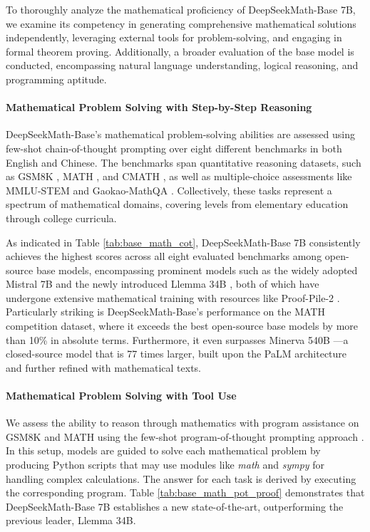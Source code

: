 To thoroughly analyze the mathematical proficiency of DeepSeekMath-Base 7B, we examine its competency in generating comprehensive mathematical solutions independently, leveraging external tools for problem-solving, and engaging in formal theorem proving. Additionally, a broader evaluation of the base model is conducted, encompassing natural language understanding, logical reasoning, and programming aptitude.

\paragraph{Mathematical Problem Solving with Step-by-Step Reasoning}

DeepSeekMath-Base’s mathematical problem-solving abilities are assessed using few-shot chain-of-thought prompting \citep{cot} over eight different benchmarks in both English and Chinese. The benchmarks span quantitative reasoning datasets, such as GSM8K \citep{gsm8k}, MATH \citep{MATH}, and CMATH \citep{wei2023cmath}, as well as multiple-choice assessments like MMLU-STEM \citep{mmlu} and Gaokao-MathQA \citep{agieval}. Collectively, these tasks represent a spectrum of mathematical domains, covering levels from elementary education through college curricula.

As indicated in Table \ref{tab:base_math_cot}, DeepSeekMath-Base 7B consistently achieves the highest scores across all eight evaluated benchmarks among open-source base models, encompassing prominent models such as the widely adopted Mistral 7B \citep{mistral} and the newly introduced Llemma 34B \citep{llemma}, both of which have undergone extensive mathematical training with resources like Proof-Pile-2 \citep{llemma}. Particularly striking is DeepSeekMath-Base’s performance on the MATH competition dataset, where it exceeds the best open-source base models by more than 10\% in absolute terms. Furthermore, it even surpasses Minerva 540B \citep{minerva}—a closed-source model that is 77 times larger, built upon the PaLM architecture \citep{palm} and further refined with mathematical texts.

\paragraph{Mathematical Problem Solving with Tool Use} We assess the ability to reason through mathematics with program assistance on GSM8K and MATH using the few-shot program-of-thought prompting approach \citep{pot,pal}. In this setup, models are guided to solve each mathematical problem by producing Python scripts that may use modules like \textit{math} and \textit{sympy} for handling complex calculations. The answer for each task is derived by executing the corresponding program. Table \ref{tab:base_math_pot_proof} demonstrates that DeepSeekMath-Base 7B establishes a new state-of-the-art, outperforming the previous leader, Llemma 34B.

